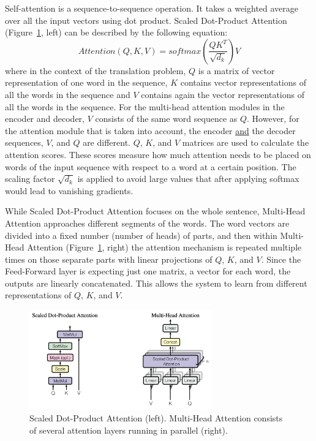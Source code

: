 Self-attention is a sequence-to-sequence operation.
It takes a weighted average over all the input vectors using dot product.
Scaled Dot-Product Attention (Figure~\ref{fig:trans_attn}, left) can be described by the following equation:
\begin{equation} \label{eq:1}
Attention(Q,K,V) = softmax(\frac{QK^T}{\sqrt{d_k}})V
\end{equation}
where in the context of the translation problem,
$Q$ is a matrix of vector representation of one word in the sequence,
$K$ contains vector representations of all the words in the sequence and
$V$ contains again the vector representations of all the words in the sequence.
For the multi-head attention modules in the encoder and decoder,
$V$ consists of the same word sequence as $Q$.
However, for the attention module that is taken into account,
the encoder \underline{and} the decoder sequences, $V$, and $Q$ are different.
$Q$, $K$, and $V$ matrices are used to calculate the attention scores.
These scores measure how much attention needs
to be placed on words of the input sequence with respect to a word at a certain position.
The scaling factor $\sqrt{d_k}$ is applied to avoid large values that after 
applying softmax would lead to vanishing gradients.

While Scaled Dot-Product Attention focuses on the whole sentence, 
Multi-Head Attention approaches different segments of the words.
The word vectors are divided into a fixed number (number of heads) of parts,
and then within Multi-Head Attention (Figure~\ref{fig:trans_attn}, right) 
the attention mechanism is repeated multiple times on those separate parts with linear projections of $Q$, $K$, and $V$.
Since the Feed-Forward layer is expecting just one matrix, a vector for each word,
the outputs are linearly concatenated.
This allows the system to learn from different representations of $Q$, $K$, and $V$.

\begin{figure}[h] %
    \centering
    \includegraphics[width=0.7\textwidth]{figures/03_blocks_overview.png} %
    \caption{Scaled Dot-Product Attention (left). Multi-Head Attention consists of several attention layers running in parallel (right). \cite{vaswani2017attention}} %
    \label{fig:trans_attn} %
\end{figure} 

